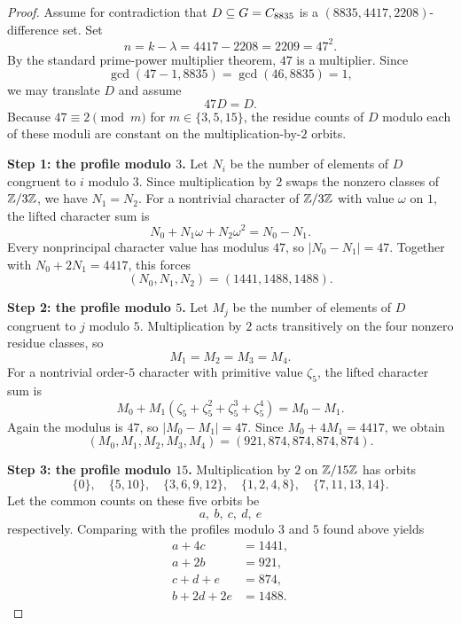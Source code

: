 \documentclass[11pt]{amsart}
\begin{document}
\begin{proof}
Assume for contradiction that $D\subseteq G=C_{8835}$ is a $(8835,4417,2208)$-difference set.
Set
\[
n=k-\lambda=4417-2208=2209=47^2.
\]
By the standard prime-power multiplier theorem, $47$ is a multiplier.
Since
\[
\gcd(47-1,8835)=\gcd(46,8835)=1,
\]
we may translate $D$ and assume
\[
47D=D.
\]
Because $47\equiv 2\pmod{m}$ for $m\in\{3,5,15\}$, the residue counts of $D$ modulo each of these moduli are constant on the multiplication-by-$2$ orbits.

\medskip
\noindent\textbf{Step 1: the profile modulo $3$.}
Let $N_i$ be the number of elements of $D$ congruent to $i$ modulo $3$.
Since multiplication by $2$ swaps the nonzero classes of $\mathbb{Z}/3\mathbb{Z}$, we have $N_1=N_2$.
For a nontrivial character of $\mathbb{Z}/3\mathbb{Z}$ with value $\omega$ on $1$, the lifted character sum is
\[
N_0+N_1\omega+N_2\omega^2 = N_0-N_1.
\]
Every nonprincipal character value has modulus $47$, so $|N_0-N_1|=47$.
Together with $N_0+2N_1=4417$, this forces
\[
(N_0,N_1,N_2)=(1441,1488,1488).
\]

\medskip
\noindent\textbf{Step 2: the profile modulo $5$.}
Let $M_j$ be the number of elements of $D$ congruent to $j$ modulo $5$.
Multiplication by $2$ acts transitively on the four nonzero residue classes, so
\[
M_1=M_2=M_3=M_4.
\]
For a nontrivial order-$5$ character with primitive value $\zeta_5$, the lifted character sum is
\[
M_0+M_1(\zeta_5+\zeta_5^2+\zeta_5^3+\zeta_5^4)=M_0-M_1.
\]
Again the modulus is $47$, so $|M_0-M_1|=47$.
Since $M_0+4M_1=4417$, we obtain
\[
(M_0,M_1,M_2,M_3,M_4)=(921,874,874,874,874).
\]

\medskip
\noindent\textbf{Step 3: the profile modulo $15$.}
Multiplication by $2$ on $\mathbb{Z}/15\mathbb{Z}$ has orbits
\[
\{0\},\quad \{5,10\},\quad \{3,6,9,12\},\quad \{1,2,4,8\},\quad \{7,11,13,14\}.
\]
Let the common counts on these five orbits be
\[
a,\ b,\ c,\ d,\ e
\]
respectively.
Comparing with the profiles modulo $3$ and $5$ found above yields
\begin{align}
a+4c &= 1441, \label{eq:mod3} \\
a+2b &= 921, \label{eq:mod5a} \\
c+d+e &= 874, \label{eq:mod5b} \\
b+2d+2e &= 1488. \label{eq:mod3b}
\end{align}


\end{proof}
\end{document}
